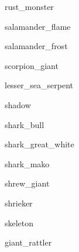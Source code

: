 \documentclass[letterpaper,serif]{module}
\begin{document}
\begin{newmonster}{rust_monster}\end{newmonster}

\begin{newmonster}{salamander_flame}\end{newmonster}

\begin{newmonster}{salamander_frost}\end{newmonster}

\begin{newmonster}{scorpion_giant}\end{newmonster}

\begin{newmonster}{lesser_sea_serpent}\end{newmonster}

\begin{newmonster}{shadow}\end{newmonster}

\begin{newmonster}{shark_bull}\end{newmonster}

\begin{newmonster}{shark_great_white}\end{newmonster}

\begin{newmonster}{shark_mako}\end{newmonster}

\begin{newmonster}{shrew_giant}\end{newmonster}

\begin{newmonster}{shrieker}\end{newmonster}

\begin{newmonster}{skeleton}\end{newmonster}

\begin{newmonster}{giant_rattler}\end{newmonster}
\end{document}
